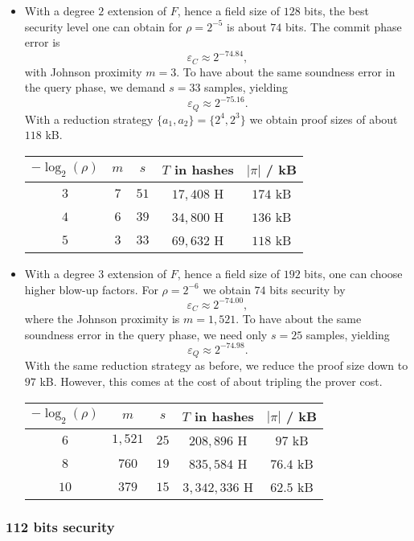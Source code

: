 \documentclass[11pt]{article}
\theoremstyle{definition}
\theoremstyle{remark}
\begin{document}
\begin{itemize}
\item
With a degree $2$ extension of $F$, hence a field size of $128$ bits, the best security level one can obtain for $\rho=2^{-5}$ is about $74$ bits. 
The commit phase error is 
\[
\varepsilon_C\approx 2^{-74.84},
\]
with Johnson proximity $m=3$. 
To have about the same soundness error in the query phase, we demand $s=33$ samples, yielding 
\[
\varepsilon_Q \approx 2^{-75.16}.
\] 
With a reduction strategy $\{a_1,a_2\}=\{2^4,2^3\}$ we obtain proof sizes of about $118$ kB. 
\begin{center}
\begin{tabular}{|c|c|c|c|c|}
\hline
$-\log_2(\rho)$ & $m$	& $s$	& $T$ in hashes 	& $|\pi|$ / kB
\\\hline\hline
$3$ 	& $7$	& $51$	& $17,408$ H 	& $174$ kB
\\
$4$ & $6$	& $39$	& $34,800$ H & $136$ kB
\\
$5$ & $3$	& $33$	& $69,632$ H 	& $118$ kB
\\\hline
\end{tabular}
\end{center}

\item
With a degree $3$ extension of $F$, hence a field size of $192$ bits, one can choose higher blow-up factors. 
For  $\rho =2^{-6}$ we obtain $74$ bits security by  
\[
\varepsilon_C\approx 2^{-74.00},
\]
where the Johnson proximity is $m=1,521$. 
To have about the same soundness error in the query phase, we need only $s=25$ samples, yielding 
\[
\varepsilon_Q\approx 2^{-74.98}.
\]
With the same reduction strategy as before, we reduce the proof size down to $97$ kB. 
However, this comes at the cost of about tripling the prover cost. 
\begin{center}
\begin{tabular}{|c|c|c|c|c|}
\hline
$-\log_2(\rho)$ & $m$	& $s$	& $T$ in hashes 	& $|\pi|$ / kB
\\\hline\hline
$6$ 	& $1,521$	& $25$	& $208,896$ H 	& $97$ kB
\\
$8$ & $760$	& $19$	& $835,584$ H & $76.4$ kB
\\
$10$ & $379$	& $15$	& $3,342,336$ H 	& $62.5$ kB
\\\hline
\end{tabular}
\end{center}

\end{itemize}


\subsubsection{112 bits security}
\end{document}
